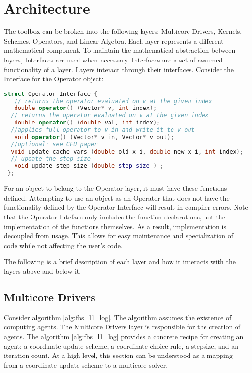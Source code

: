 \section{Architecture}

The toolbox can be broken into the following layers: Multicore Drivers, Kernels, Schemes, Operators, and Linear Algebra.
Each layer represents a different mathematical component. 
To maintain the mathematical abstraction between layers, Interfaces are used when necessary. 
Interfaces are a set of assumed functionality of a layer.
Layers interact through their interfaces.
Consider the Interface for the Operator object:

\begin{lstlisting}[language=C++,label={Operator_Interface}]
struct Operator_Interface {
   // returns the operator evaluated on v at the given index
   double operator() (Vector* v, int index);
  // returns the operator evaluated on v at the given index
   double operator() (double val, int index);
  //applies full operator to v_in and write it to v_out
   void operator() (Vector* v_in, Vector* v_out);
  //optional: see CFU paper
  void update_cache_vars (double old_x_i, double new_x_i, int index);
  // update the step size
   void update_step_size (double step_size_) ;
 };
\end{lstlisting}

For an object to belong to the Operator layer, it must have these functions defined.
Attempting to use an object as an Operator that does not have the functionality defined by the Operator Interface will result in compiler errors.
Note that the Operator Inteface only includes the function declarations, not the implementation of the functions themselves.
As a result, implementation is decoupled from usage.
This allows for easy maintenance and specialization of code while not affecting the user's code.

The following is a brief description of each layer and how it interacts with the layers above and below it.

\subsection{Multicore Drivers}


Consider algorithm \ref{alg:fbs_l1_log}.
 The algorithm assumes the existence of computing agents.
The Multicore Drivers  layer is responsible for the creation of agents.
The  algorithm \ref{alg:fbs_l1_log} provides a concrete recipe for creating an agent: a coordinate update scheme, a coordinate choice rule, a stepsize, and an iteration count.
At a high level, this section can be understood as a mapping from a coordinate update scheme to a multicore solver.

